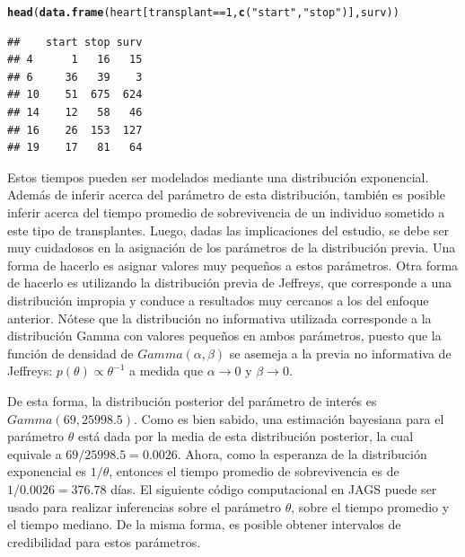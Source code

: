 \documentclass[10pt,openright]{book}\usepackage[]{graphicx}\usepackage[]{color}
\makeatletter
\newcommand{\hlnum}[1]{\textcolor[rgb]{0.686,0.059,0.569}{#1}}%
\newcommand{\hlstr}[1]{\textcolor[rgb]{0.192,0.494,0.8}{#1}}%
\newcommand{\hlopt}[1]{\textcolor[rgb]{0,0,0}{#1}}%
\newcommand{\hlstd}[1]{\textcolor[rgb]{0.345,0.345,0.345}{#1}}%
\newcommand{\hlkwd}[1]{\textcolor[rgb]{0.737,0.353,0.396}{\textbf{#1}}}%
\newenvironment{kframe}{%
 \def\at@end@of@kframe{}%
 \ifinner\ifhmode%
  \def\at@end@of@kframe{\end{minipage}}%
  \begin{minipage}{\columnwidth}%
 \fi\fi%
 \def\FrameCommand##1{\hskip\@totalleftmargin \hskip-\fboxsep
 \colorbox{shadecolor}{##1}\hskip-\fboxsep
     \hskip-\linewidth \hskip-\@totalleftmargin \hskip\columnwidth}%
 \MakeFramed {\advance\hsize-\width
   \@totalleftmargin\z@ \linewidth\hsize
   \@setminipage}}%
 {\par\unskip\endMakeFramed%
 \at@end@of@kframe}
\newenvironment{knitrout}{}{} %
\makeatother
\begin{document}
\begin{Eje}
\begin{knitrout}
\color{fgcolor}\begin{kframe}
\begin{alltt}
\hlkwd{head}\hlstd{(}\hlkwd{data.frame}\hlstd{(heart[transplant}\hlopt{==}\hlnum{1}\hlstd{,}\hlkwd{c}\hlstd{(}\hlstr{"start"}\hlstd{,}\hlstr{"stop"}\hlstd{)], surv))}
\end{alltt}
\begin{verbatim}
##    start stop surv
## 4      1   16   15
## 6     36   39    3
## 10    51  675  624
## 14    12   58   46
## 16    26  153  127
## 19    17   81   64
\end{verbatim}
\end{kframe}
\end{knitrout}
    Estos tiempos pueden ser modelados mediante una distribuci\'on exponencial. Adem\'as de inferir acerca del par\'ametro de esta distribuci\'on, tambi\'en es posible inferir acerca del tiempo promedio de sobrevivencia de un individuo sometido a este tipo de transplantes. Luego, dadas las implicaciones del estudio, se debe ser muy cuidadosos en la asignaci\'on de los par\'ametros de la distribuci\'on previa. Una forma de hacerlo es asignar valores muy peque\~nos a estos par\'ametros. Otra forma de hacerlo es utilizando la distribuci\'on previa de Jeffreys, que corresponde a una distribuci\'on impropia y conduce a resultados muy cercanos a los del enfoque anterior. N\'otese que la distribuci\'on no informativa utilizada corresponde a la distribuci\'on Gamma con valores peque\~nos en ambos par\'ametros, puesto que la funci\'on de densidad de $Gamma(\alpha,\beta)$ se asemeja a la previa no informativa de Jeffreys: $p(\theta)\propto \theta^{-1}$ a medida que $\alpha\rightarrow 0$ y $\beta\rightarrow 0$.
    
    De esta forma, la distribuci\'on posterior del par\'ametro de inter\'es es $Gamma(69, 25998.5)$. Como es bien sabido, una estimaci\'on bayesiana para el par\'ametro $\theta$ est\'a dada por la media de esta distribuci\'on posterior, la cual equivale a $69/25998.5=0.0026$. Ahora, como la esperanza de la distribuci\'on exponencial es $1/\theta$, entonces el tiempo promedio de sobrevivencia es de $1/0.0026=376.78$ d\'ias. El siguiente c\'odigo computacional en JAGS puede ser usado para realizar inferencias sobre el par\'ametro $\theta$, sobre el tiempo promedio y el tiempo mediano. De la misma forma, es posible obtener intervalos de credibilidad para estos par\'ametros.
    

\end{Eje}
\end{document}
